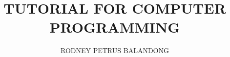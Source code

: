 \documentclass{clgrammar}
\title{TUTORIAL FOR COMPUTER PROGRAMMING}
\author{RODNEY PETRUS BALANDONG}
\begin{document}
\maketitle

\tableofcontents
\listofchanges

    
    
    

    
    
    
    
    
    
    
    
    
    
\end{document}
